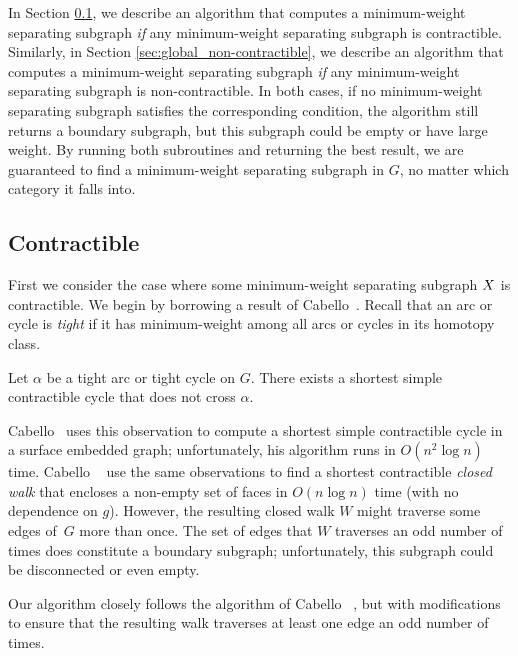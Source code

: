 \documentclass[letterpaper,review]{siamart190516}
\begin{document}
{In Section \ref{sec:global_contractible}, we describe an algorithm that computes a minimum-weight separating subgraph \emph{if} any minimum-weight separating subgraph is contractible.  Similarly, in Section \ref{sec:global_non-contractible}, we describe an algorithm that computes a minimum-weight separating subgraph \emph{if} any minimum-weight separating subgraph is non-contractible.  In both cases, if no minimum-weight separating subgraph satisfies the corresponding condition, the algorithm still returns a boundary subgraph, but this subgraph could be empty or have large weight.  By running both subroutines and returning the best result, we are guaranteed to find a minimum-weight separating subgraph in $G$, no matter which category it falls into.



\subsection{Contractible}
\label{sec:global_contractible}

First we consider the case where some minimum-weight separating subgraph $X$ is contractible.  
We begin by borrowing a result of Cabello~\cite[Lemma 4.1]{c-fscss-10}.  Recall that an arc or cycle is \emph{tight} if it has minimum-weight among all arcs or cycles in its homotopy class.

\begin{lemma}
\label{lem:disjoint-tight-arc}
Let $\alpha$ be a tight arc or tight cycle on $G$.  There exists a shortest simple contractible cycle that does not cross $\alpha$.
\end{lemma}

Cabello~\cite{c-fscss-10} uses this observation to compute a shortest simple contractible cycle in a surface embedded graph; unfortunately, his algorithm runs in $O(n^2\log n)$ time.
Cabello \etal~\cite{cdem-fotc-10} use the same observations to find a shortest contractible \emph{closed walk} that encloses a non-empty set of faces in $O(n\log n)$ time (with no dependence on $g$).
However, the resulting closed walk $W$ might traverse some edges of~$G$ more than once.  The set of edges that $W$ traverses an odd number of times does constitute a boundary subgraph; unfortunately, this subgraph could be disconnected or even empty.

Our algorithm closely follows the algorithm of Cabello \etal~\cite{cdem-fotc-10}, but with modifications to ensure that the resulting walk traverses at least one edge an odd number of times.

}
\end{document}

